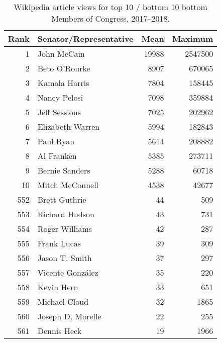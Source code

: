 \begin{table}[t!]
\centering
\caption{Wikipedia article views for top 10 / bottom 10 bottom Members of Congress, 2017--2018.\label{tab:pageviewstop}} 
\begingroup\small
\begin{tabular}{rlrr}
  \toprule
Rank & Senator/Representative & Mean & Maximum \\ 
  \midrule
1 & John McCain & 19988 & 2547500 \\ 
  2 & Beto O'Rourke & 8907 & 670065 \\ 
  3 & Kamala Harris & 7804 & 158445 \\ 
  4 & Nancy Pelosi & 7098 & 359884 \\ 
  5 & Jeff Sessions & 7025 & 202962 \\ 
   \midrule
6 & Elizabeth Warren & 5994 & 182843 \\ 
  7 & Paul Ryan & 5614 & 208882 \\ 
  8 & Al Franken & 5385 & 273711 \\ 
  9 & Bernie Sanders & 5288 & 60718 \\ 
  10 & Mitch McConnell & 4538 & 42677 \\ 
   \midrule
552 & Brett Guthrie & 44 & 509 \\ 
  553 & Richard Hudson & 43 & 731 \\ 
  554 & Roger Williams & 42 & 287 \\ 
  555 & Frank Lucas & 39 & 309 \\ 
  556 & Jason T. Smith & 37 & 297 \\ 
   \midrule
557 & Vicente González & 35 & 220 \\ 
  558 & Kevin Hern & 33 & 651 \\ 
  559 & Michael Cloud & 32 & 1865 \\ 
  560 & Joseph D. Morelle & 22 & 255 \\ 
  561 & Dennis Heck & 19 & 1966 \\ 
   \bottomrule
\end{tabular}
\endgroup
\end{table}
